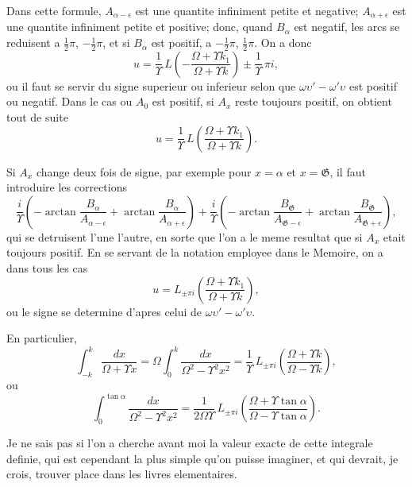 \documentclass[11pt,a4paper]{article}
\begin{document}
Dans cette formule, $A_{\alpha-\epsilon}$ est une quantite infiniment petite et negative; $A_{\alpha+\epsilon}$ est
une quantite infiniment petite et positive; donc, quand $B_{\alpha}$ est negatif, les arcs se
reduisent a $\frac{1}{2}\pi$, $-\frac{1}{2}\pi$, et si $B_{\alpha}$ est positif, a $-\frac{1}{2}\pi$, $\frac{1}{2}\pi$. On a donc
\begin{equation}
u = \frac{1}{\Upsilon}\, L\left(-\frac{\Omega + \Upsilon k_1}{\Omega + \Upsilon k}\right) \pm \frac{1}{\Upsilon}\, \pi i, \tag{60}
\end{equation}
ou il faut se servir du signe superieur ou inferieur selon que $\omega\upsilon' - \omega'\upsilon$ est positif ou
negatif. Dans le cas ou $A_0$ est positif, si $A_x$ reste toujours positif, on obtient tout de
suite
\begin{equation}
u = \frac{1}{\Upsilon}\, L\left(\frac{\Omega + \Upsilon k_1}{\Omega + \Upsilon k}\right). \tag{61}
\end{equation}

Si $A_x$ change deux fois de signe, par exemple pour $x = \alpha$ et $x = \mathfrak{G}$, il faut introduire
les corrections
\[\frac{i}{\Upsilon}\left(-\arctan \frac{B_{\alpha}}{A_{\alpha-\epsilon}} + \arctan \frac{B_{\alpha}}{A_{\alpha+\epsilon}}\right)
+ \frac{i}{\Upsilon}\left(-\arctan \frac{B_{\mathfrak{G}}}{A_{\mathfrak{G}-\epsilon}} + \arctan \frac{B_{\mathfrak{G}}}{A_{\mathfrak{G}+\epsilon}}\right),\]
qui se detruisent l'une l'autre, en sorte que l'on a le meme resultat que si $A_x$ etait
toujours positif. En se servant de la notation employee dans le Memoire, on a dans
tous les cas
\begin{equation}
u = L_{\pm\pi i}\left(\frac{\Omega + \Upsilon k_1}{\Omega + \Upsilon k}\right), \tag{62}
\end{equation}
ou le signe se determine d'apres celui de $\omega\upsilon' - \omega'\upsilon$.

En particulier,
\[\int_{-k}^k \frac{dx}{\Omega + \Upsilon x} = \Omega \int_0^k \frac{dx}{\Omega^2 - \Upsilon^2 x^2}
= \frac{1}{\Upsilon}\, L_{\pm\pi i}\left(\frac{\Omega + \Upsilon k}{\Omega - \Upsilon k}\right),\]
ou
\begin{equation}
\int_0^{\tan\alpha} \frac{dx}{\Omega^2 - \Upsilon^2 x^2} = \frac{1}{2\Omega\Upsilon}\, L_{\pm\pi i}\left(\frac{\Omega + \Upsilon\tan\alpha}{\Omega - \Upsilon\tan\alpha}\right). \tag{63}
\end{equation}

Je ne sais pas si l'on a cherche avant moi la valeur exacte de cette integrale definie,
qui est cependant la plus simple qu'on puisse imaginer, et qui devrait, je crois, trouver
place dans les livres elementaires.
\end{document}
